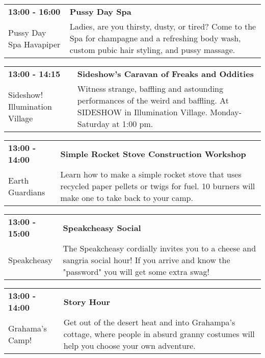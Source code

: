 \begin{tabular}{ p{1in} p{2.2in} }
    \textbf{13:00 - 16:00} & \textbf{Pussy Day Spa} \\
    Pussy Day Spa \newline Havapiper & Ladies, are you thirsty, dusty, or tired? Come to the Spa for champagne and a refreshing body wash, custom pubic hair styling, and pussy massage. \\
    \hline 
\end{tabular}
    
\begin{tabular}{ p{1in} p{2.2in} }
    \textbf{13:00 - 14:15} & \textbf{Sideshow's Caravan of Freaks and Oddities} \\
    Sideshow! \newline Illumination Village & Witness strange, baffling and astounding performances of the weird and baffling. At SIDESHOW in Illumination Village. Monday-Saturday at 1:00 pm. \\
    \hline 
\end{tabular}
    
\begin{tabular}{ p{1in} p{2.2in} }
    \textbf{13:00 - 14:00} & \textbf{Simple Rocket Stove Construction Workshop } \\
    Earth Guardians \newline  & Learn how to make a simple rocket stove that uses recycled paper pellets or twigs for fuel. 10 burners will make one to take back to your camp. \\
    \hline 
\end{tabular}
    
\begin{tabular}{ p{1in} p{2.2in} }
    \textbf{13:00 - 15:00} & \textbf{Speakcheasy Social} \\
    Speakcheasy \newline  & The Speakcheasy cordially invites you to a cheese and sangria social hour! If you arrive and know the "password" you will get some extra swag! \\
    \hline 
\end{tabular}
    
\begin{tabular}{ p{1in} p{2.2in} }
    \textbf{13:00 - 14:00} & \textbf{Story Hour} \\
    Grahama's Camp! \newline  & Get out of the desert heat and into Grahampa's cottage, where people in absurd granny costumes will help you choose your own adventure. \\
    \hline 
\end{tabular}
    
